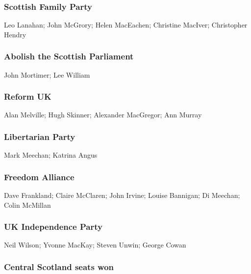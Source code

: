 \begin{resultsiii}
	\subsubsection*{Scottish Family Party}
	Leo Lanahan; John McGrory; Helen MacEachen; Christine MacIver; Christopher Hendry
	
	\subsubsection*{Abolish the Scottish Parliament}
	John Mortimer; Lee William
	
	\subsubsection*{Reform UK}
	Alan Melville; Hugh Skinner; Alexander MacGregor; Ann Murray
	
	\subsubsection*{Libertarian Party}
	Mark Meechan; Katrina Angus
	
	\subsubsection*{Freedom Alliance}
	Dave Frankland; Claire McClaren; John Irvine; Louise Bannigan; Di Meechan; Colin McMillan
\end{resultsiii}\vfill\eject\begin{resultsiii}	
	\subsubsection*{UK Independence Party}
	Neil Wilson; Yvonne MacKay; Steven Unwin; George Cowan
\end{resultsiii}

\subsubsection*{Central Scotland seats won}

